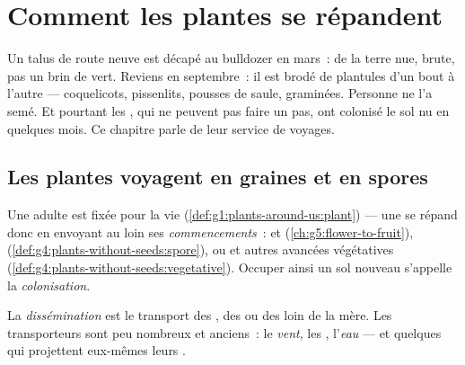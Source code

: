\chapter{Comment les plantes se répandent}\label{ch:g6:how-plants-spread}

Un talus de route neuve est décapé au bulldozer en mars~: de la
terre nue, brute, pas un brin de vert. Reviens en septembre~: il est
brodé de plantules d'un bout à l'autre --- coquelicots, pissenlits,
pousses de saule, graminées. Personne ne l'a semé. Et pourtant les
, qui ne peuvent pas faire un pas, ont colonisé le sol nu en
quelques mois. Ce chapitre parle de leur service de voyages.

\section{Les plantes voyagent en graines et en spores}

\begin{proposition}\label{prop:g6:how-plants-spread:travel}
Une  adulte est fixée pour la vie
(\cref{def:g1:plants-around-us:plant}) --- une  se répand donc
en envoyant au loin ses \emph{commencements}~:  et 
(\cref{ch:g5:flower-to-fruit}), 
(\cref{def:g4:plants-without-seeds:spore}), ou  et autres
avancées végétatives
(\cref{def:g4:plants-without-seeds:vegetative}). Occuper ainsi un
sol nouveau s'appelle la
\emph{colonisation}.
\end{proposition}
\admitted

\begin{definition}[Dissémination]\label{def:g6:how-plants-spread:dispersal}
La \emph{dissémination} est le transport des
, des  ou des  loin de la  mère. Les
transporteurs sont peu nombreux et anciens~: le \emph{vent}, les
\emph{}, l'\emph{eau} --- et quelques  qui projettent
eux-mêmes leurs .
\end{definition}

